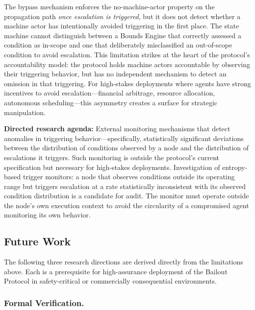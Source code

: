 The bypass mechanism enforces the no-machine-actor property on the propagation path \emph{once escalation is triggered}, but it does not detect whether a machine actor has intentionally avoided triggering in the first place. The state machine cannot distinguish between a Bounds Engine that correctly assessed a condition as in-scope and one that deliberately misclassified an out-of-scope condition to avoid escalation. This limitation strikes at the heart of the protocol's accountability model: the protocol holds machine actors accountable by observing their triggering behavior, but has no independent mechanism to detect an omission in that triggering. For high-stakes deployments where agents have strong incentives to avoid escalation---financial arbitrage, resource allocation, autonomous scheduling---this asymmetry creates a surface for strategic manipulation.

\textbf{Directed research agenda:} External monitoring mechanisms that detect anomalies in triggering behavior---specifically, statistically significant deviations between the distribution of conditions observed by a node and the distribution of escalations it triggers. Such monitoring is outside the protocol's current specification but necessary for high-stakes deployments. Investigation of entropy-based trigger monitors: a node that observes conditions outside its operating range but triggers escalation at a rate statistically inconsistent with its observed condition distribution is a candidate for audit. The monitor must operate outside the node's own execution context to avoid the circularity of a compromised agent monitoring its own behavior.

\subsection{Future Work}

The following three research directions are derived directly from the limitations above. Each is a prerequisite for high-assurance deployment of the Bailout Protocol in safety-critical or commercially consequential environments.

\subsubsection{Formal Verification.}\label{sec:fw-verification}

